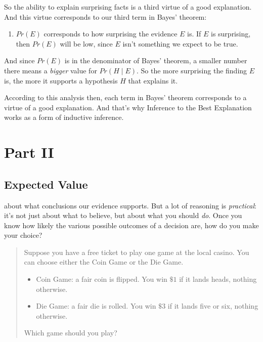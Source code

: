 \documentclass[justified]{tufte-book}
\providecommand{\tightlist}{%
  \setlength{\itemsep}{0pt}\setlength{\parskip}{0pt}}
\newcommand{\given}{\mid}
\newcommand{\p}{Pr}
\newenvironment{problem}{\begin{quote}\normalsize}{\end{quote}}
\theoremstyle{definition}
\theoremstyle{definition}
\theoremstyle{definition}
\theoremstyle{remark}
\begin{document}
So the ability to explain surprising facts is a third virtue of a good
explanation. And this virtue corresponds to our third term in Bayes'
theorem:

\begin{enumerate}
\def\labelenumi{\arabic{enumi}.}
\setcounter{enumi}{2}
\tightlist
\item
  \(\p(E)\) corresponds to how surprising the evidence \(E\) is. If
  \(E\) is surprising, then \(\p(E)\) will be low, since \(E\) isn't
  something we expect to be true.
\end{enumerate}

And since \(\p(E)\) is in the denominator of Bayes' theorem, a smaller
number there means a \emph{bigger} value for \(\p(H \given E)\). So the
more surprising the finding \(E\) is, the more it supports a hypothesis
\(H\) that explains it.

According to this analysis then, each term in Bayes' theorem corresponds
to a virtue of a good explanation. And that's why Inference to the Best
Explanation works as a form of inductive inference.

\hypertarget{part-part-ii}{%
\part*{Part II}\label{part-part-ii}}

\hypertarget{expected-value}{%
\chapter{Expected Value}\label{expected-value}}

 about what conclusions our
evidence supports. But a lot of reasoning is \emph{practical}: it's not
just about what to believe, but about what you should \emph{do}. Once
you know how likely the various possible outcomes of a decision are, how
do you make your choice?

\begin{problem}
Suppose you have a free ticket to play one game at the local casino. You
can choose either the Coin Game or the Die Game.

\begin{itemize}
\tightlist
\item
  Coin Game: a fair coin is flipped. You win \(\$1\) if it lands heads,
  nothing otherwise.
\item
  Die Game: a fair die is rolled. You win \(\$3\) if it lands five or
  six, nothing otherwise.
\end{itemize}

Which game should you play?
\end{problem}
\end{document}
